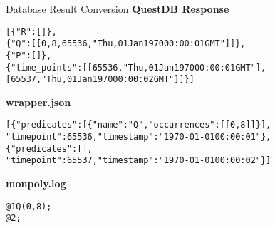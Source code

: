 \begin{frame}{Database Result Conversion}
\textbf{QuestDB Response}
\vspace{-0.2cm}
    \begin{alltt}
[\{"R":[]\},\\
\{"Q":[[0,8,65536,"Thu, 01 Jan 1970 00:00:01 GMT"]]\},\\
\{"P":[]\},\\
\{"time\_points":[[65536,"Thu, 01 Jan 1970 00:00:01 GMT"],
                 [65537,"Thu, 01 Jan 1970 00:00:02 GMT"]]\}]
    \end{alltt}
\textbf{wrapper.json}
\vspace{-0.2cm}
    \begin{alltt}
    [\{"predicates":[\{"name":"Q","occurrences":[[0,8]]\}], \\
        "timepoint":65536,"timestamp":"1970-01-01 00:00:01"\}, \\
    \{"predicates":[],\\
    "timepoint":65537,"timestamp":"1970-01-01 00:00:02"\}]
    \end{alltt}

\textbf{monpoly.log}
\vspace{-0.2cm}
    \begin{alltt}
@1 Q(0,8); \\
@2 ;
    \end{alltt}

    
\end{frame}